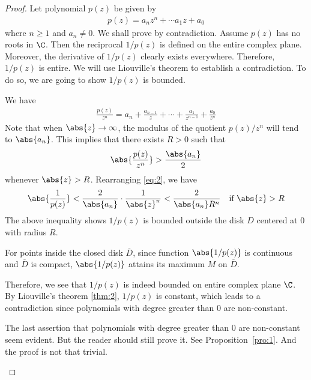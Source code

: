 \documentclass[thmcnt=section, color=cyan, 12pt]{my-elegantbook}
\begin{document}
\begin{proof}
    Let polynomial $p(z)$ be given by
    \begin{align*}
        p(z) = a_n z^n + \cdots a_1 z + a_0
    \end{align*}
    where $n \geq 1$ and $a_n \neq 0$.
    We shall prove by contradiction.
    Assume $p(z)$ has no roots in $\C$. Then the reciprocal $1 / p(z)$ is defined on the entire
    complex plane.
    Moreover, the derivative of $1 / p(z)$ clearly exists everywhere.
    Therefore, $1 / p(z)$ is entire.
    We will use Liouville's theorem to establish a contradiction.
    To do so, we are going to show $1 / p(z)$ is bounded.

    We have
    \begin{align*}
        \frac{p(z)}{z^n} = a_n + \frac{a_{n-1}}{z} + \cdots + \frac{a_1}{z^{n-1}} + \frac{a_0}{z^n}
    \end{align*}
    Note that when $\abs{z} \to \infty$, the modulus of the quotient $p(z) / z^n$ will
    tend to $\abs{a_n}$.
    This implies that there exists $R > 0$ such that
    \begin{align}
        \abs{\frac{p(z)}{z^n}} > \frac{\abs{a_n}}{2}
        \label{eq:2}
    \end{align}
    whenever $\abs{z} > R$. Rearranging \eqref{eq:2}, we have
    \begin{align*}
        \abs{\frac{1}{p(z)}} < \frac{2}{\abs{a_n}} \cdot \frac{1}{\abs{z}^n} < \frac{2}{\abs{a_n} R^n} \quad \text{if } \abs{z} > R
    \end{align*}
    The above inequality shows $1 / p(z)$ is bounded outside the disk $D$ centered
    at $0$ with radius $R$.

    For points inside the closed disk $\overline{D}$, since function $\abs{1 / p(z)}$ is
    continuous and $\overline{D}$ is compact, $\abs{1 / p(z)}$ attains its maximum $M$ on $\overline{D}$.

    Therefore, we see that $1 / p(z)$ is indeed bounded on entire complex plane $\C$.
    By Liouville's theorem \ref{thm:2}, $1 / p(z)$ is constant, which leads to a
    contradiction since polynomials with degree greater than $0$ are non-constant.


    \begin{note}
        The last assertion that polynomials with degree greater than $0$ are
        non-constant seem evident. But the reader should still prove it. See Proposition~\ref{pro:1}.
        And the proof is not that trivial.
    \end{note}
\end{proof}
\end{document}
